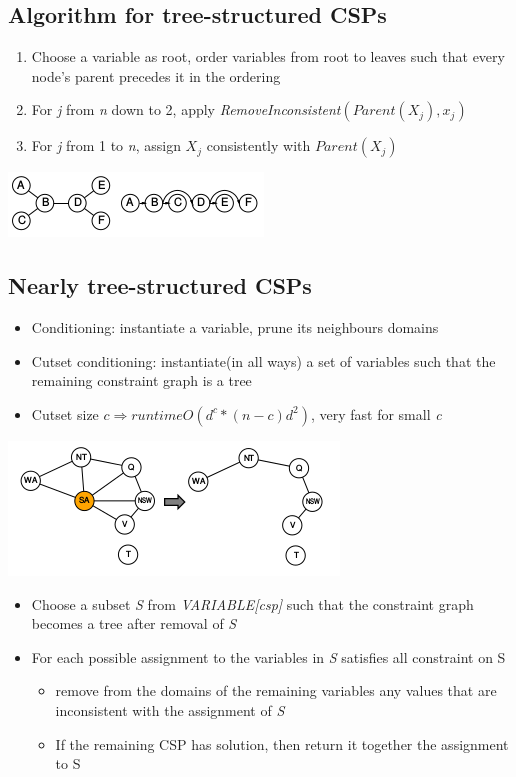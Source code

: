 \subsection{Algorithm for tree-structured CSPs}
\begin{enumerate}
\item Choose a variable as root, order variables from root to leaves such that every node's parent precedes it in the ordering
\item For \textit{j} from \textit{n} down to 2, apply \textit{RemoveInconsistent}$(Parent(X_j),x_j)$
\item For \textit{j} from 1 to \textit{n}, assign $X_j$ consistently with $Parent(X_j)$
\end{enumerate}
\includegraphics[scale=1]{chap1_pics/treestructurealgorithm.png} 

\subsection{Nearly tree-structured CSPs}
\begin{itemize}
\item Conditioning: instantiate a variable, prune its neighbours domains
\item Cutset conditioning: instantiate(in all ways) a set of variables such that the remaining constraint graph is a tree
\item Cutset size $c \Rightarrow runtime O(d^c * (n-c)d^2)$, very fast for small \textit{c}
\end{itemize}

\includegraphics[scale=1]{chap1_pics/treestructuremap.png} 
\label{treestructuremap}

\begin{itemize}
\item Choose a subset \textit{S} from \textit{VARIABLE[csp]} such that the constraint graph becomes a tree after removal of \textit{S}
\item For each possible assignment to the variables in \textit{S} satisfies all constraint on S 
\begin{itemize}
\item remove from the domains of the remaining variables any values that are inconsistent with the assignment of \textit{S}
\item If the remaining CSP has solution, then return it together the assignment to S
\end{itemize}
\end{itemize}

